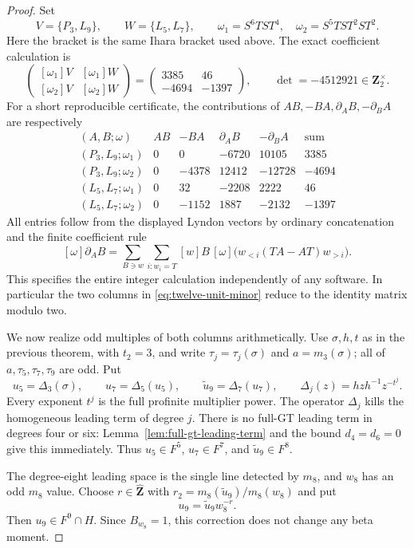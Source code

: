 \begin{proof}
Set
\[
 V=\{P_3,L_9\},\qquad W=\{L_5,L_7\},\qquad
 \omega_1=S^6TST^4,\quad\omega_2=S^5TST^2ST^2.
\]
Here the bracket is the same Ihara bracket used above. The exact
coefficient calculation is
\begin{equation}\label{eq:twelve-unit-minor}
 \begin{pmatrix}
 [\omega_1]V&[\omega_1]W\\
 [\omega_2]V&[\omega_2]W
 \end{pmatrix}
 =\begin{pmatrix}3385&46\\-4694&-1397\end{pmatrix},
 \qquad \det=-4512921\in\mathbf Z_2^\times.
\end{equation}
For a short reproducible certificate, the contributions of
$AB,-BA,\partial_A B,-\partial_B A$ are respectively
\[
\begin{array}{c|r|r|r|r|r}
(A,B;\omega)&AB&-BA&\partial_A B&-\partial_B A&\text{sum}\\\hline
(P_3,L_9;\omega_1)&0&0&-6720&10105&3385\\
(P_3,L_9;\omega_2)&0&-4378&12412&-12728&-4694\\
(L_5,L_7;\omega_1)&0&32&-2208&2222&46\\
(L_5,L_7;\omega_2)&0&-1152&1887&-2132&-1397
\end{array}
\]
All entries follow from the displayed Lyndon vectors by ordinary
concatenation and the finite coefficient rule
\[
 [\omega]\partial_A B=
 \sum_{B\ni w}\sum_{i:w_i=T}
       [w]B\,[\omega]\bigl(w_{<i}(TA-AT)w_{>i}\bigr).
\]
This specifies the entire integer calculation independently of
any software. In particular the two columns in
\eqref{eq:twelve-unit-minor} reduce to the identity matrix
modulo two.

We now realize odd multiples of both columns arithmetically.
Use $\sigma,h,t$ as in the previous theorem, with $t_2=3$, and
write $\tau_j=\tau_j(\sigma)$ and $a=m_3(\sigma)$; all of
$a,\tau_5,\tau_7,\tau_9$ are odd. Put
\[
 u_5=\Delta_3(\sigma),\qquad
 u_7=\Delta_5(u_5),\qquad
 \widetilde u_9=\Delta_7(u_7),\qquad
 \Delta_j(z)=hzh^{-1}z^{-t^j}.
\]
Every exponent $t^j$ is the full profinite multiplier power.
The operator $\Delta_j$ kills the homogeneous leading term of
degree $j$. There is no full-GT leading term in degrees four or
six: Lemma~\ref{lem:full-gt-leading-term} and the bound $d_4=d_6=0$
give this immediately. Thus $u_5\in F^5$, $u_7\in F^7$, and
$\widetilde u_9\in F^8$.

The degree-eight leading space is the single line detected by
$m_8$, and $w_8$ has an odd $m_8$ value. Choose
$r\in\widehat{\mathbf Z}$ with
$r_2=m_8(\widetilde u_9)/m_8(w_8)$ and put
\[
 u_9=\widetilde u_9 w_8^{-r}.
\]
Then $u_9\in F^9\cap H$. Since $B_{w_8}=1$, this correction
does not change any beta moment.


\end{proof}
